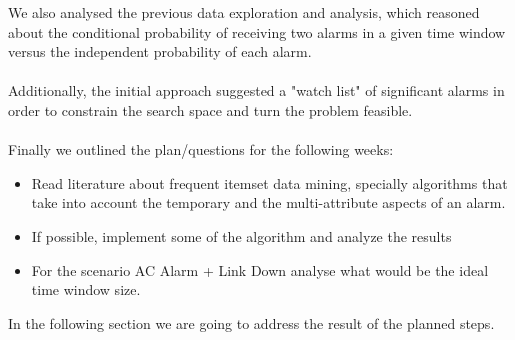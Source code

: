 \documentclass[10pt,a4paper]{article}
\begin{document}
We also analysed the previous data exploration and analysis, which reasoned about the conditional probability of receiving two alarms in a given time window versus the independent probability of each alarm.
\\\\
Additionally, the initial approach suggested a "watch list" of significant alarms in order to constrain the search space and turn the problem feasible.
\\\\
Finally we outlined the plan/questions for the following weeks:
\begin{itemize}
\item Read literature about frequent itemset data mining, specially algorithms that take into account the temporary and the multi-attribute aspects of an alarm.
\item If possible, implement some of the algorithm and analyze the results
\item For the scenario AC Alarm + Link Down analyse what would be the ideal time window size.
\end{itemize}

In the following section we are going to address the result of the planned steps.
\end{document}
